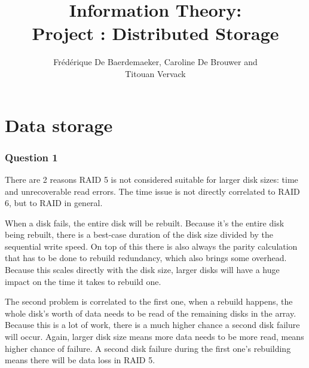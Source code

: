 \documentclass[12pt,a4paper,oneside]{article}
\begin{document}


\title{Information Theory: \\ Project : Distributed Storage}
\author{Fr\'ed\'erique De Baerdemaeker, Caroline De Brouwer and\\Titouan Vervack}
\maketitle

\section{Data storage}
\subsubsection*{Question 1}
There are 2 reasons RAID 5 is not considered suitable for larger disk sizes: time and unrecoverable read errors. The time issue is not directly correlated to RAID 6, but to RAID in general. 

When a disk fails, the entire disk will be rebuilt. Because it's the entire disk being rebuilt, there is a best-case duration of the disk size divided by the sequential write speed. On top of this there is also always the parity calculation that has to be done to rebuild redundancy, which also brings some overhead. Because this scales directly with the disk size, larger disks will have a huge impact on the time it takes to rebuild one.

The second problem is correlated to the first one, when a rebuild happens, the whole disk's worth of data needs to be read of the remaining disks in the array. Because this is a lot of work, there is a much higher chance a second disk failure will occur. Again, larger disk size means more data needs to be more read, means higher chance of failure. A second disk failure during the first one's rebuilding means there will be data loss in RAID 5.
\end{document}
